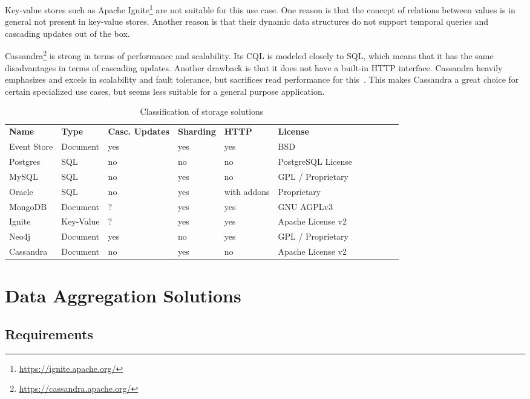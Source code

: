 Key-value stores such as Apache Ignite\footnote{\url{https://ignite.apache.org/}} are not suitable for this use case.
One reason is that the concept of relations between values is in general not present in key-value stores.
Another reason is that their dynamic data structures do not support temporal queries and cascading updates out of the box.

Cassandra\footnote{\url{https://cassandra.apache.org/}} is strong in terms of performance and scalability.
Its \ac{CQL} is modeled closely to \ac{SQL}, which means that it has the same disadvantages in terms of cascading updates.
Another drawback is that it does not have a built-in HTTP interface.
Cassandra heavily emphasizes and excels in scalability and fault tolerance, but sacrifices read performance for this~\cite{6625441}.
This makes Cassandra a great choice for certain specialized use cases, but seems less suitable for a general purpose application.

\begin{table}[]
\centering
\caption{Classification of storage solutions}
\label{table:system:storage}
\begin{tabular}{lllllllllll}
\textbf{Name} & \textbf{Type} & \textbf{Casc. Updates} & \textbf{Sharding} & \textbf{HTTP} & \textbf{License} \\
Event Store & Document & yes & yes & yes & BSD \\
Postgres & SQL & no & no & no & PostgreSQL License \\
MySQL & SQL & no & yes & no & GPL / Proprietary \\
Oracle & SQL & no & yes & with addons & Proprietary \\
MongoDB & Document & ? & yes & yes & GNU AGPLv3 \\
Ignite & Key-Value & ? & yes & yes & Apache License v2 \\
Neo4j & Document & yes & no & yes & GPL / Proprietary \\
Cassandra & Document & no & yes & no & Apache License v2
\end{tabular}
\label{table:classifications:storage}
\end{table}

\section{Data Aggregation Solutions}
\label{sec:system:aggregation}

\subsection{Requirements}



